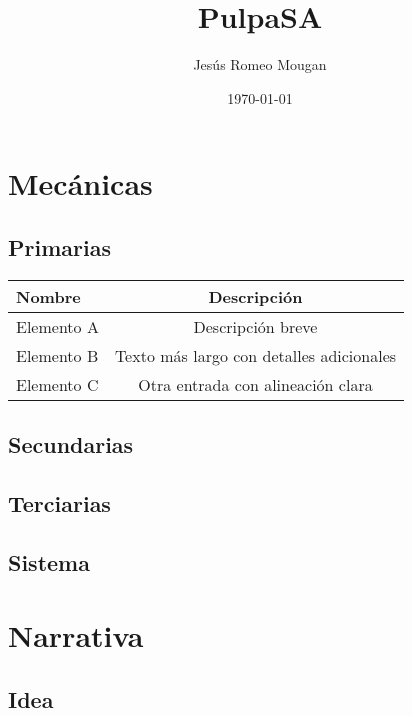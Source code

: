 \documentclass{report}  %
\title{PulpaSA}  %
\author{Jesús Romeo Mougan}                     %
\date{\today}                           %
\begin{document}


\renewcommand{\contentsname}{Índice}

\tableofcontents


\newpage

\section{Mecánicas}

\subsection{Primarias}

\begin{table}[h]
    \centering
    \label{tab:ejemplo}
    \begin{tabular}{|l|c|}
        \hline
        \textbf{Nombre}  & \textbf{Descripción} \\
        \hline
        Elemento A & Descripción breve \\
        \hline
        Elemento B & Texto más largo con detalles adicionales  \\
        \hline
        Elemento C & Otra entrada con alineación clara  \\
        \hline
    \end{tabular}
\end{table}

\subsection{Secundarias}

\subsection{Terciarias}

\subsection{Sistema}


\section{Narrativa}

\subsection{Idea}
\end{document}

